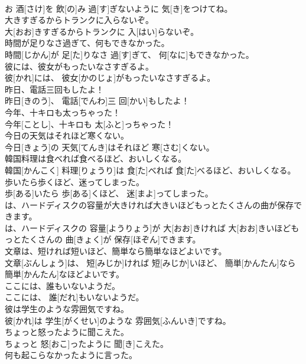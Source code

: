 \documentclass[8pt]{extreport}
\begin{document}
\begin{CJK}{UTF8}{min}
\\	お 酒[さけ]を 飲[の]み 過[す]ぎないように 気[き]をつけてね。	
\\	大きすぎるからトランクに入らないぞ。	
\\	大[おお]きすぎるからトランクに 入[はい]らないぞ。	
\\	時間が足りなさ過ぎて、何もできなかった。	
\\	時間[じかん]が 足[た]りなさ 過[す]ぎて、 何[なに]もできなかった。	
\\	彼には、彼女がもったいなさすぎるよ。	
\\	彼[かれ]には、 彼女[かのじょ]がもったいなさすぎるよ。	
\\	昨日、電話三回もしたよ！	
\\	昨日[きのう]、 電話[でんわ]三 回[かい]もしたよ！	
\\	今年、十キロも太っちゃった！	
\\	今年[ことし]、十キロも 太[ふと]っちゃった！	
\\	今日の天気はそれほど寒くない。	
\\	今日[きょう]の 天気[てんき]はそれほど 寒[さむ]くない。	
\\	韓国料理は食べれば食べるほど、おいしくなる。	
\\	韓国[かんこく] 料理[りょうり]は 食[た]べれば 食[た]べるほど、おいしくなる。	
\\	歩いたら歩くほど、迷ってしまった。	
\\	歩[ある]いたら 歩[ある]くほど、 迷[まよ]ってしまった。	
\\	は、ハードディスクの容量が大きければ大きいほどもっとたくさんの曲が保存できます。	
\\	は、ハードディスクの 容量[ようりょう]が 大[おお]きければ 大[おお]きいほどもっとたくさんの 曲[きょく]が 保存[ほぞん]できます。	
\\	文章は、短ければ短いほど、簡単なら簡単なほどよいです。	
\\	文章[ぶんしょう]は、 短[みじか]ければ 短[みじか]いほど、 簡単[かんたん]なら 簡単[かんたん]なほどよいです。	
\\	ここには、誰もいないようだ。	
\\	ここには、 誰[だれ]もいないようだ。	
\\	彼は学生のような雰囲気ですね。	
\\	彼[かれ]は 学生[がくせい]のような 雰囲気[ふんいき]ですね。	
\\	ちょっと怒ったように聞こえた。	
\\	ちょっと 怒[おこ]ったように 聞[き]こえた。	
\\	何も起こらなかったように言った。	

\end{CJK}
\end{document}
